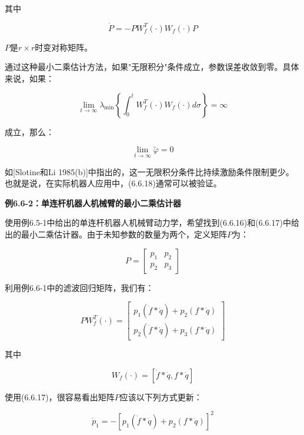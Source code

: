 \documentclass[12pt,a4paper]{ctexart}
\begin{document}
其中

\begin{equation}\label{eq:P-def}
\dot{P} = -P W_f^T(\cdot)W_f(\cdot)P
\end{equation}

$P$是$r \times r$时变对称矩阵。

通过这种最小二乘估计方法，如果"无限积分"条件成立，参数误差收敛到零。具体来说，如果：

\begin{equation}\label{eq:infinite-integral}
\lim_{t \to \infty} \lambda_{\min}\left\{\int_0^t W_f^T(\cdot)W_f(\cdot)d\sigma\right\} = \infty
\end{equation}

成立，那么：

\begin{equation}\label{eq:param-converge}
\lim_{t \to \infty} \tilde{\varphi} = 0
\end{equation}

如[Slotine和Li 1985(b)]中指出的，这一无限积分条件比持续激励条件限制更少。也就是说，在实际机器人应用中，(6.6.18)通常可以被验证。

\textbf{例6.6-2：单连杆机器人机械臂的最小二乘估计器}

使用例6.5-1中给出的单连杆机器人机械臂动力学，希望找到(6.6.16)和(6.6.17)中给出的最小二乘估计器。由于未知参数的数量为两个，定义矩阵$P$为：

\begin{equation}
P = \begin{bmatrix} p_1 & p_2 \\ p_2 & p_3 \end{bmatrix}
\end{equation}

利用例6.6-1中的滤波回归矩阵，我们有：

\begin{equation}
P W_f^T(\cdot) = \begin{bmatrix} p_1(\dot{f} * \dot{q}) + p_2(f * \dot{q}) \\ p_2(\dot{f} * \dot{q}) + p_3(f * \dot{q}) \end{bmatrix}
\end{equation}

其中

\begin{equation}
W_f(\cdot) = [\dot{f} * \dot{q}, f * \dot{q}]
\end{equation}

使用(6.6.17)，很容易看出矩阵$P$应该以下列方式更新：

\begin{equation}
\dot{p}_1 = -[p_1(\dot{f} * \dot{q}) + p_2(f * \dot{q})]^2
\end{equation}
\end{document}
